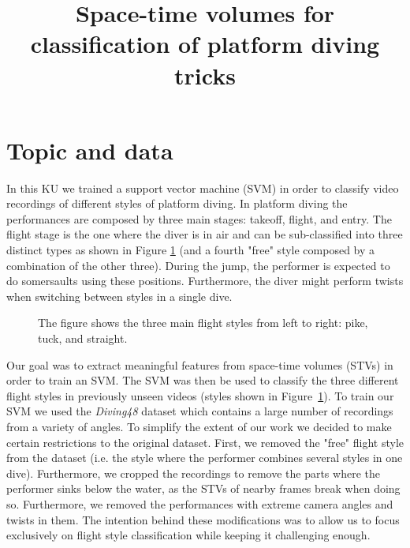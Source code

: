 \documentclass[a4paper, textwidth=18cm, textheight=24cm, top=1cm, bottom=1cm, left=1cm, right=1cm10pt]{article}
\begin{document}
\noindent



\title{Space-time volumes for classification of platform diving tricks}


\maketitle

\section{Topic and data}

In this KU we trained a support vector machine (SVM) in order to classify video recordings of different styles of platform diving. In platform diving the performances are composed by three main stages: takeoff, flight, and entry. The flight stage is the one where the diver is in air and can be sub-classified into three distinct types as shown in Figure \ref{fig:dive-styles} (and a fourth "free" style composed by a combination of the other three). During the jump, the performer is expected to do somersaults using these positions. Furthermore, the diver might perform twists when switching between styles in a single dive.

\begin{figure}[!htb]
\caption{\label{fig:dive-styles} The figure shows the three main flight styles from left to right: pike, tuck, and straight.}
\end{figure}

Our goal was to extract meaningful features from space-time volumes (STVs) in order to train an SVM. The SVM was then be used to classify the three different flight styles in previously unseen videos (styles shown in Figure~\ref{fig:dive-styles}). To train our SVM we used the \textit{Diving48} dataset \cite{ref-diving48} which contains a large number of recordings from a variety of angles. To simplify the extent of our work we decided to make certain restrictions to the original dataset. First, we removed the "free" flight style from the dataset (i.e. the style where the performer combines several styles in one dive). Furthermore, we cropped the recordings to remove the parts where the performer sinks below the water, as the STVs of nearby frames break when doing so. Furthermore, we removed the performances with extreme camera angles and twists in them. The intention behind these modifications was to allow us to focus exclusively on flight style classification while keeping it challenging enough.
\end{document}
